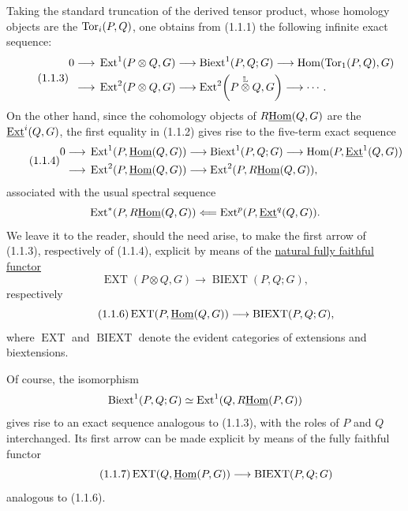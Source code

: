 Taking the standard truncation of the derived tensor product, whose
homology objects are the $\operatorname{Tor}_i(P,Q)$, one obtains from (1.1.1) the
following infinite exact sequence:
\begin{equation}\tag{1.1.3}
\begin{aligned}
0\longrightarrow{}&
 \operatorname{Ext}^1(P\otimes Q,G)
 \longrightarrow \operatorname{Biext}^1(P,Q;G)
 \longrightarrow \operatorname{Hom}(\operatorname{Tor}_1(P,Q),G)\\
 \longrightarrow{}&
 \operatorname{Ext}^2(P\otimes Q,G)
 \longrightarrow
 \operatorname{Ext}^2\!\left(P\mathbin{\overset{\mathbb L}{\otimes}}Q,G\right)
 \longrightarrow\cdots .
\end{aligned}
\end{equation}
On the other hand, since the cohomology objects of $R\uHom(Q,G)$ are
the $\uExt^i(Q,G)$, the first equality in (1.1.2) gives rise to the
five-term exact sequence
\begin{equation}\tag{1.1.4}
\begin{aligned}
0\longrightarrow{}&
 \Ext^1(P,\uHom(Q,G))
 \longrightarrow \Biext^1(P,Q;G)
 \longrightarrow \Hom(P,\uExt^1(Q,G))\\
 \longrightarrow{}&
 \Ext^2(P,\uHom(Q,G))
 \longrightarrow \Ext^2(P,R\uHom(Q,G)),
\end{aligned}
\end{equation}
associated with the usual spectral sequence
\[
 \Ext^*(P,R\uHom(Q,G))
 \Longleftarrow
 \Ext^p(P,\uExt^q(Q,G)).
\]
We leave it to the reader, should the need arise, to make the first
arrow of (1.1.3), respectively of (1.1.4), explicit by means of the
\underline{natural fully faithful functor}
\begin{equation}\tag{1.1.5}
 \operatorname{EXT}(P\otimes Q,G)
 \longrightarrow
 \operatorname{BIEXT}(P,Q;G),
\end{equation}
respectively
\begin{equation}\tag{1.1.6}
 \operatorname{EXT}(P,\uHom(Q,G))
 \longrightarrow
 \operatorname{BIEXT}(P,Q;G),
\end{equation}
where $\operatorname{EXT}$ and $\operatorname{BIEXT}$ denote the
evident categories of extensions and biextensions.

Of course, the isomorphism
\[
 \Biext^1(P,Q;G)\simeq\Ext^1(Q,R\uHom(P,G))
\]
gives rise to an exact sequence analogous to (1.1.3), with the roles
of $P$ and $Q$ interchanged.  Its first arrow can be made explicit by
means of the fully faithful functor
\begin{equation}\tag{1.1.7}
 \operatorname{EXT}(Q,\uHom(P,G))
 \longrightarrow
 \operatorname{BIEXT}(P,Q;G)
\end{equation}
analogous to (1.1.6).

